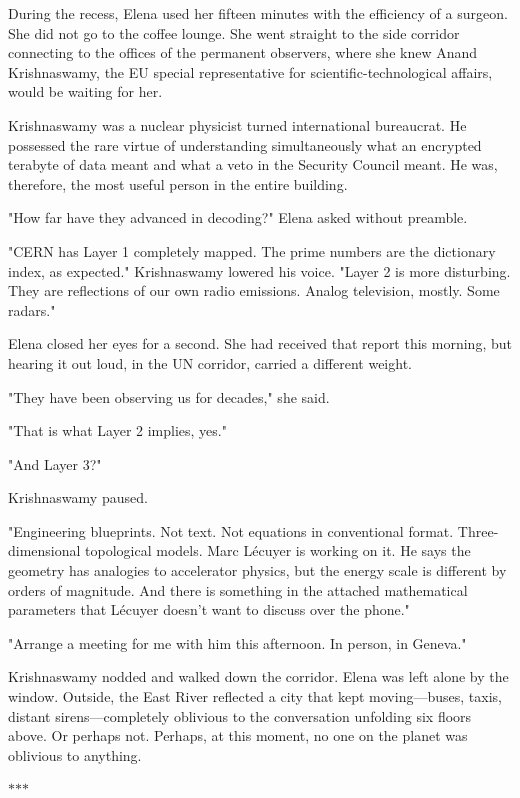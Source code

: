 \documentclass[11pt,a5paper,twoside]{book}
\begin{document}
During the recess, Elena used her fifteen minutes with the efficiency of a surgeon. She did not go to the coffee lounge. She went straight to the side corridor connecting to the offices of the permanent observers, where she knew Anand Krishnaswamy, the EU special representative for scientific-technological affairs, would be waiting for her.

Krishnaswamy was a nuclear physicist turned international bureaucrat. He possessed the rare virtue of understanding simultaneously what an encrypted terabyte of data meant and what a veto in the Security Council meant. He was, therefore, the most useful person in the entire building.

"How far have they advanced in decoding?" Elena asked without preamble.

"CERN has Layer 1 completely mapped. The prime numbers are the dictionary index, as expected." Krishnaswamy lowered his voice. "Layer 2 is more disturbing. They are reflections of our own radio emissions. Analog television, mostly. Some radars."

Elena closed her eyes for a second. She had received that report this morning, but hearing it out loud, in the UN corridor, carried a different weight.

"They have been observing us for decades," she said.

"That is what Layer 2 implies, yes."

"And Layer 3?"

Krishnaswamy paused.

"Engineering blueprints. Not text. Not equations in conventional format. Three-dimensional topological models. Marc Lécuyer is working on it. He says the geometry has analogies to accelerator physics, but the energy scale is different by orders of magnitude. And there is something in the attached mathematical parameters that Lécuyer doesn't want to discuss over the phone."

"Arrange a meeting for me with him this afternoon. In person, in Geneva."

Krishnaswamy nodded and walked down the corridor. Elena was left alone by the window. Outside, the East River reflected a city that kept moving—buses, taxis, distant sirens—completely oblivious to the conversation unfolding six floors above. Or perhaps not. Perhaps, at this moment, no one on the planet was oblivious to anything.

\vspace{1.5em}
\begin{center}$\ast$\quad$\ast$\quad$\ast$\end{center}
\vspace{1.5em}
\end{document}
